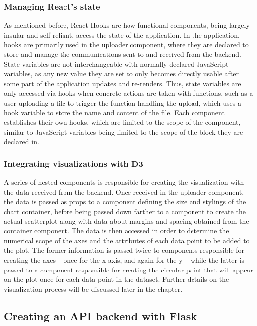 \subsubsection{Managing React's state}

As mentioned before, React Hooks are how functional components, being largely insular and self-reliant, access the state of the application. In the application, hooks are primarily used in the uploader component, where they are declared to store and manage the communications sent to and received from the backend. State variables are not interchangeable with normally declared JavaScript variables, as any new value they are set to only becomes directly usable after some part of the application updates and re-renders. Thus, state variables are only accessed via hooks when concrete actions are taken with functions, such as a user uploading a file to trigger the function handling the upload, which uses a hook variable to store the name and content of the file. Each component establishes their own hooks, which are limited to the scope of the component, similar to JavaScript variables being limited to the scope of the block they are declared in.

\subsubsection{Integrating visualizations with D3}

A series of nested components is responsible for creating the visualization with the data received from the backend. Once received in the uploader component, the data is passed as props to a component defining the size and stylings of the chart container, before being passed down farther to a component to create the actual scatterplot along with data about margins and spacing obtained from the container component. The data is then accessed in order to determine the numerical scope of the axes and the attributes of each data point to be added to the plot. The former information is passed twice to components responsible for creating the axes -- once for the x-axis, and again for the y -- while the latter is passed to a component responsible for creating the circular point that will appear on the plot once for each data point in the dataset. Further details on the visualization process will be discussed later in the chapter.

\subsection{Creating an API backend with Flask}

